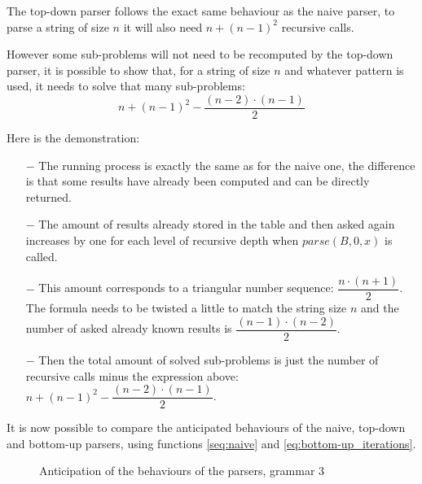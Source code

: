 The top-down parser follows the exact same behaviour as the naive parser, to parse a string of size $n$ it will also need $n + (n - 1)^2$ recursive calls.

However some sub-problems will not need to be recomputed by the top-down parser, it is possible to show that, for a string of size $n$ and whatever pattern is used, it needs to solve that many sub-problems:
\begin{equation}\label{seq:top-down}
n + (n - 1)^2 - \dfrac{(n - 2) \cdot (n - 1)}{2}
\end{equation}

Here is the demonstration:

\begin{itemize}
    \item[$-$] The running process is exactly the same as for the naive one, the difference is that some results have already been computed and can be directly returned.
    \item[$-$] The amount of results already stored in the table and then asked again increases by one for each level of recursive depth when $parse(B, 0, x)$ is called.
    \item[$-$] This amount corresponds to a triangular number sequence: $\dfrac{n \cdot (n + 1)}{2}$. The formula needs to be twisted a little to match the string size $n$ and the number of asked already known results is $\dfrac{(n - 1) \cdot (n - 2)}{2}$.
    \item[$-$] Then the total amount of solved sub-problems is just the number of recursive calls minus the expression above: $n + (n - 1)^2 - \dfrac{(n - 2) \cdot (n - 1)}{2}$.
\end{itemize}

It is now possible to compare the anticipated behaviours of the naive, top-down and bottom-up parsers, using functions \ref{seq:naive} and \ref{eq:bottom-up_iterations}.

\FloatBarrier
\begin{figure}[h]
\caption{Anticipation of the behaviours of the parsers, grammar 3}
\end{figure}
\FloatBarrier

